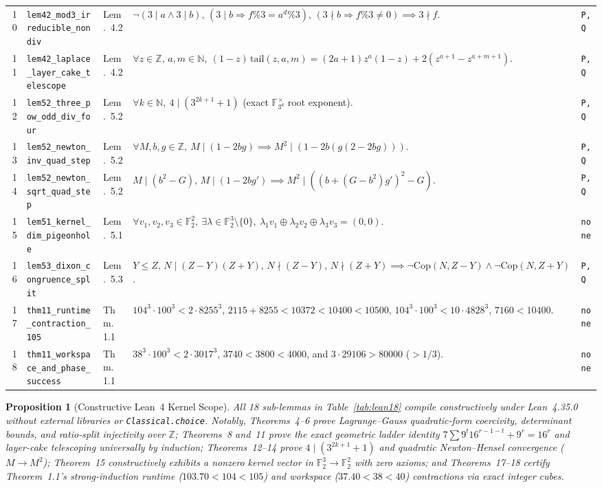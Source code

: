 \documentclass[10pt,twocolumn]{article}
\newtheorem{proposition}{Proposition}
\newcommand{\ZZ}{\mathbb{Z}}
\newcommand{\NN}{\mathbb{N}}
\newcommand{\FF}{\mathbb{F}}
\begin{document}
\begin{table}[t]
\begin{tabular}{@{}r l l p{9.6cm} l@{}}
10 & \texttt{lem42\_mod3\_irreducible\_nondiv} & Lem.~4.2 & $\neg(3\mid a\wedge 3\mid b),\,(3\mid b\Rightarrow f\%3=a^d\%3),\,(3\nmid b\Rightarrow f\%3\ne 0) \implies 3\nmid f$. & \texttt{P,Q} \\
11 & \texttt{lem42\_laplace\_layer\_cake\_telescope} & Lem.~4.2 & $\forall z\in\ZZ,\,a,m\in\NN,\ (1-z)\,\mathrm{tail}(z,a,m)=(2a+1)z^a(1-z)+2(z^{a+1}-z^{a+m+1})$. & \texttt{P,Q} \\
12 & \texttt{lem52\_three\_pow\_odd\_div\_four} & Lem.~5.2 & $\forall k\in\NN,\ 4 \mid (3^{2k+1} + 1)$ (exact $\FF_{3^d}^\times$ root exponent). & \texttt{P,Q} \\
13 & \texttt{lem52\_newton\_inv\_quad\_step} & Lem.~5.2 & $\forall M,b,g\in\ZZ,\ M\mid(1-2bg) \implies M^2 \mid (1-2b(g(2-2bg)))$. & \texttt{P,Q} \\
14 & \texttt{lem52\_newton\_sqrt\_quad\_step} & Lem.~5.2 & $M\mid(b^2-G),\,M\mid(1-2b g') \implies M^2 \mid ((b+(G-b^2)g')^2 - G)$. & \texttt{P,Q} \\
15 & \texttt{lem51\_kernel\_dim\_pigeonhole} & Lem.~5.1 & $\forall v_1,v_2,v_3\in\FF_2^2,\ \exists \lambda\in\FF_2^3\setminus\{0\},\ \lambda_1 v_1\oplus\lambda_2 v_2\oplus\lambda_3 v_3=(0,0)$. & \texttt{none} \\
16 & \texttt{lem53\_dixon\_congruence\_split} & Lem.~5.3 & $Y\le Z,\,N\mid(Z{-}Y)(Z{+}Y),\,N\nmid(Z{-}Y),\,N\nmid(Z{+}Y) \implies \neg\mathrm{Cop}(N,Z{-}Y)\wedge\neg\mathrm{Cop}(N,Z{+}Y)$. & \texttt{P,Q} \\
17 & \texttt{thm11\_runtime\_contraction\_105} & Thm.~1.1 & $104^3\cdot 100^3<2\cdot 8255^3$, $2115{+}8255<10372<10400<10500$, $104^3\cdot 100^3<10\cdot 4828^3$, $7160<10400$. & \texttt{none} \\
18 & \texttt{thm11\_workspace\_and\_phase\_success} & Thm.~1.1 & $38^3\cdot 100^3<2\cdot 3017^3$, $3740<3800<4000$, and $3\cdot 29106 > 80000$ ($>1/3$). & \texttt{none} \\
\bottomrule
\end{tabular}
\end{table}

\begin{proposition}[Constructive Lean~4 Kernel Scope]\label{prop:lean}
\normalfont All 18 sub-lemmas in Table~\ref{tab:lean18} compile constructively under Lean~4.35.0 without external libraries or \texttt{Classical.choice}. Notably, Theorems~4--6 prove Lagrange--Gauss quadratic-form coercivity, determinant bounds, and ratio-split injectivity over $\ZZ$; Theorems~8 and~11 prove the exact geometric ladder identity $7\sum 9^t 16^{r-1-t}+9^r=16^r$ and layer-cake telescoping universally by induction; Theorems~12--14 prove $4\mid(3^{2k+1}+1)$ and quadratic Newton--Hensel convergence ($M\to M^2$); Theorem~15 constructively exhibits a nonzero kernel vector in $\FF_2^3\to\FF_2^2$ with zero axioms; and Theorems~17--18 certify Theorem~1.1's strong-induction runtime ($103.70<104<105$) and workspace ($37.40<38<40$) contractions via exact integer cubes.
\end{proposition}
\end{document}
